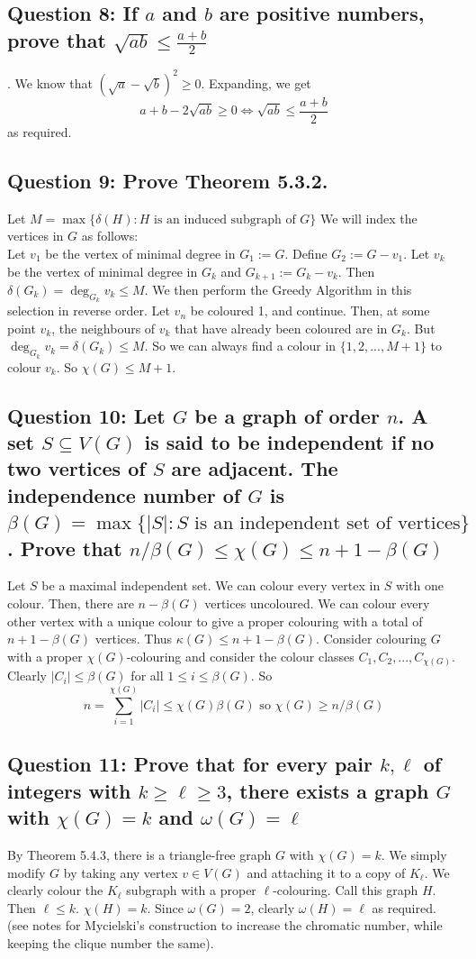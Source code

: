 \documentclass[letterpaper, 11pt]{article}
\newcommand{\1}{\mathds{1}}	%
\theoremstyle{definition}
\begin{document}
\subsection*{Question 8: If $a$ and $b$ are positive numbers, prove that $\sqrt{ab} \le \frac{a+b}{2}$}.
We know that $(\sqrt{a}-\sqrt{b})^2 \ge 0$. Expanding, we get \[
a + b - 2\sqrt{ab} \ge 0 \iff \sqrt{ab} \le \frac{a+b}{2}
\]
as required.

\subsection*{Question 9: Prove Theorem 5.3.2.}
Let $M = \max \{\delta (H): H \text{ is an induced subgraph of } G\}$
We will index the vertices in $G$ as follows:\\ Let $v_1$ be the vertex of minimal degree in $G_1 := G$. Define $G_2 := G - v_1$. Let $v_k$ be the vertex of minimal degree in $G_{k}$ and $G_{k+1} := G_{k} - v_k$. Then $\delta (G_k) = \deg _{G_{k}}v_{k} \le M$. We then perform the Greedy Algorithm in this selection in reverse order. Let $v_n$ be coloured 1, and continue. Then, at some point $v_k$, the neighbours of $v_k$ that have already been coloured are in $G_k$. But $\deg _{G_k} v_k = \delta (G_k) \le M$. So we can always find a colour in $\{1,2,...,M+1\}$ to colour $v_k$. So $\chi (G) \le M+1$.
\subsection*{Question 10: Let $G$ be a graph of order $n$. A set $S \subseteq V(G)$ is said to be independent if no two
vertices of $S$ are adjacent. The independence number of $G$ is $\beta(G) = \max\{|S|: S \text{ is an independent set of vertices}\}$. Prove that $n/\beta (G) \le \chi (G) \le n+1-\beta (G)$}
Let $S$ be a maximal independent set. We can colour every vertex in $S$ with one colour. Then, there are $n - \beta (G)$ vertices uncoloured. We can colour every other vertex with a unique colour to give a proper colouring with a total of $n+1 - \beta (G)$ vertices. Thus $\kappa (G) \le n+1 - \beta (G)$. Consider colouring $G$ with a proper $\chi (G)$-colouring and consider the colour classes $C_1,C_2,...,C_{\chi (G)}$. Clearly $|C_i| \le \beta (G)$ for all $1 \le i \le \beta (G)$. So \[
n = \sum \limits _{i=1}^{\chi (G)} |C_i| \le \chi (G) \beta (G) \text{ so }\chi(G) \ge n/\beta (G)
\]


\subsection*{Question 11: Prove that for every pair $k, \ell$ of integers with $k \ge \ell \ge 3$, there exists a graph $G$ with
$\chi (G) = k$ and $\omega (G) = \ell$}
By Theorem 5.4.3, there is a triangle-free graph $G$ with $\chi (G) = k$. We simply modify $G$ by taking any vertex $v \in V(G)$ and attaching it to a copy of $K_{\ell}$. We clearly colour the $K_\ell$ subgraph with a proper $\ell$-colouring. Call this graph $H$. Then $\ell \le k$. $\chi (H) = k$. Since $\omega(G)=2$, clearly $\omega(H) = \ell$ as required. 
(see notes for Mycielski's construction to increase the chromatic number, while keeping the clique number the same).
\end{document}
